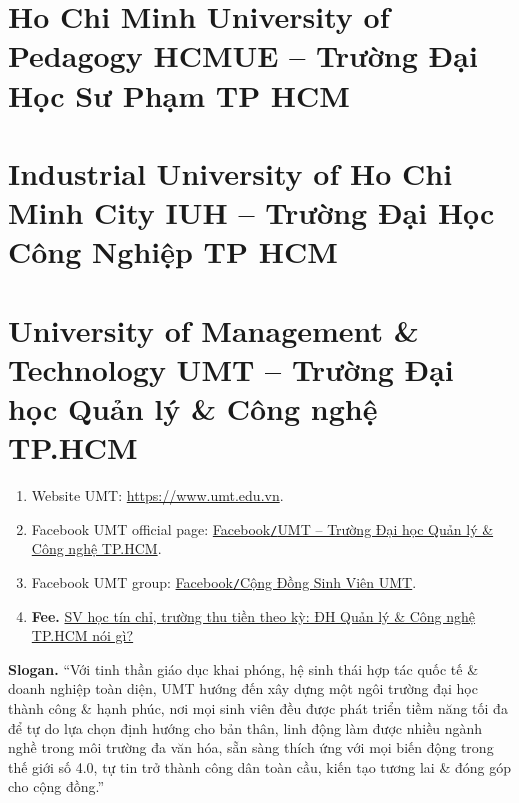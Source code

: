 \documentclass{article}
\begin{document}

\section{Ho Chi Minh University of Pedagogy HCMUE -- Trường Đại Học Sư Phạm TP HCM}


\section{Industrial University of Ho Chi Minh City IUH -- Trường Đại Học Công Nghiệp TP HCM}


\section{University of Management \& Technology UMT -- Trường Đại học Quản lý \& Công nghệ TP.HCM}
\begin{enumerate}
	\item Website UMT: \url{https://www.umt.edu.vn}.
	\item Facebook UMT official page: \href{https://www.facebook.com/UMTUniversity}{Facebook{\tt/}UMT -- Trường Đại học Quản lý \& Công nghệ TP.HCM}.
	\item Facebook UMT group: \href{https://www.facebook.com/groups/690300442040851}{Facebook{\tt/}Cộng Đồng Sinh Viên UMT}.
	\item {\bf Fee.} \href{https://giaoduc.net.vn/sv-hoc-tin-chi-truong-thu-tien-theo-ky-dh-quan-ly-va-cong-nghe-tphcm-noi-gi-post238408.gd}{SV học tín chỉ, trường thu tiền theo kỳ: ĐH Quản lý  \&  Công nghệ TP.HCM nói gì?}
\end{enumerate}
{\bf Slogan.} ``Với tinh thần giáo dục khai phóng, hệ sinh thái hợp tác quốc tế \& doanh nghiệp toàn diện, UMT hướng đến xây dựng một ngôi trường đại học thành công \& hạnh phúc, nơi mọi sinh viên đều được phát triển tiềm năng tối đa để tự do lựa chọn định hướng cho bản thân, linh động làm được nhiều ngành nghề trong môi trường đa văn hóa, sẵn sàng thích ứng với mọi biến động trong thế giới số 4.0, tự tin trở thành công dân toàn cầu, kiến tạo tương lai \& đóng góp cho cộng đồng.''

\end{document}
